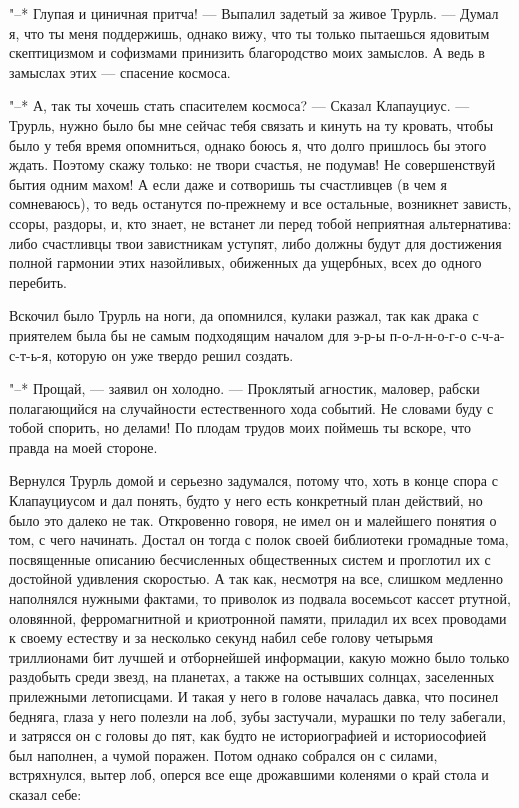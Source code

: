 "--* Глупая и циничная притча! --- Выпалил задетый за живое
Трурль. --- Думал я, что ты меня поддержишь, однако вижу, что
ты только пытаешься ядовитым скептицизмом и софизмами
принизить благородство моих замыслов. А ведь в замыслах этих --- спасение
космоса.

"--* А, так  ты хочешь стать спасителем  космоса? --- Сказал
Клапауциус.  ---  Трурль,  нужно  было бы  мне  сейчас  тебя
связать  и кинуть  на ту  кровать, чтобы  было у  тебя время
опомниться,  однако боюсь  я,  что долго  пришлось бы  этого
ждать. Поэтому  скажу только: не твори  счастья, не подумав!
Не совершенствуй бытия одним махом!  А если даже и сотворишь
ты  счастливцев  (в чем  я  сомневаюсь),  то ведь  останутся
по-прежнему  и  все  остальные,  возникнет  зависть,  ссоры,
раздоры, и, кто знает, не  встанет ли перед тобой неприятная
альтернатива: либо счастливцы твои завистникам уступят, либо
должны будут для достижения полной гармонии этих назойливых,
обиженных да ущербных, всех до одного перебить.

Вскочил было Трурль на ноги, да опомнился, кулаки разжал,
так как драка с приятелем была бы не самым подходящим
началом для э-р-ы п-о-л-н-о-г-о с-ч-а-с-т-ь-я, которую он
уже твердо решил создать.

"--* Прощай, --- заявил он холодно. --- Проклятый агностик,
маловер, рабски полагающийся на случайности естественного
хода событий. Не словами буду с тобой спорить, но делами! По
плодам трудов моих поймешь ты вскоре, что правда на моей
стороне.

Вернулся Трурль домой и серьезно задумался, потому
что, хоть в конце спора с Клапауциусом и дал понять, будто у
него есть конкретный план действий, но было это далеко не
так. Откровенно говоря, не имел он и малейшего понятия о
том, с чего начинать. Достал он тогда с полок своей
библиотеки громадные тома, посвященные описанию бесчисленных
общественных систем и проглотил их с достойной удивления
скоростью. А так как, несмотря на все, слишком медленно
наполнялся нужными фактами, то приволок из подвала восемьсот
кассет ртутной, оловянной, ферромагнитной и криотронной
памяти, приладил их всех проводами к своему естеству и за
несколько секунд набил себе голову четырьмя триллионами бит
лучшей и отборнейшей информации, какую можно было только
раздобыть среди звезд, на планетах, а также на остывших
солнцах, заселенных прилежными летописцами. И такая у него в
голове началась давка, что посинел бедняга, глаза у него
полезли на лоб, зубы застучали, мурашки по телу забегали, и
затрясся он с головы до пят, как будто не историографией и
историософией был наполнен, а чумой поражен. Потом однако
собрался он с силами, встряхнулся, вытер лоб, оперся все еще
дрожавшими коленями о край стола и сказал себе:

